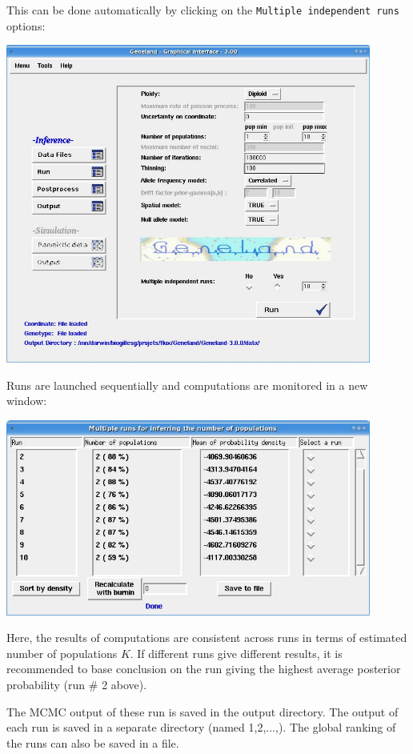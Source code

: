\documentclass[a4paper,10pt]{article}
\begin{document}
This can be done automatically by clicking on the \texttt{Multiple independent runs} options:\\
\bigskip

\centerline{\includegraphics[width=12cm]{./fig/multip_run.jpg}}

\newpage
Runs are launched sequentially and computations are monitored in a new window:
\\
\bigskip

\centerline{\includegraphics[width=12cm]{./fig/multip_run2.jpg}}


\bigskip

Here, the results of computations are consistent across runs in terms of estimated number of populations $K$. 
If different runs give different results, it is recommended to base conclusion on the run giving the highest average posterior 
probability (run $\#$ 2 above).

The MCMC output of these run is saved in the output directory. The output of each run is saved in a separate directory (named 1,2,...,).
The global ranking of the runs can also be saved in a file. 
\end{document}
